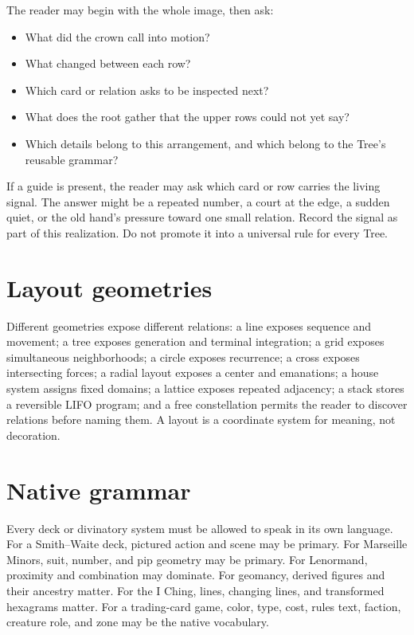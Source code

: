 The reader may begin with the whole image, then ask:

\begin{itemize}
\item What did the crown call into motion?
\item What changed between each row?
\item Which card or relation asks to be inspected next?
\item What does the root gather that the upper rows could not yet say?
\item Which details belong to this arrangement, and which belong to the Tree's
      reusable grammar?
\end{itemize}

If a guide is present, the reader may ask which card or row carries the living
signal. The answer might be a repeated number, a court at the edge, a sudden
quiet, or the old hand's pressure toward one small relation. Record the signal
as part of this realization. Do not promote it into a universal rule for every
Tree.

\section{Layout geometries}

Different geometries expose different relations: a line exposes sequence and
movement; a tree exposes generation and terminal integration; a grid exposes
simultaneous neighborhoods; a circle exposes recurrence; a cross exposes
intersecting forces; a radial layout exposes a center and emanations; a house
system assigns fixed domains; a lattice exposes repeated adjacency; a stack
stores a reversible LIFO program; and a free constellation permits the reader
to discover relations before naming them. A layout is a coordinate system for
meaning, not decoration.

\section{Native grammar}

Every deck or divinatory system must be allowed to speak in its own language.
For a Smith--Waite deck, pictured action and scene may be primary. For Marseille
Minors, suit, number, and pip geometry may be primary. For Lenormand,
proximity and combination may dominate. For geomancy, derived figures and
their ancestry matter. For the I Ching, lines, changing lines, and transformed
hexagrams matter. For a trading-card game, color, type, cost, rules text,
faction, creature role, and zone may be the native vocabulary.

